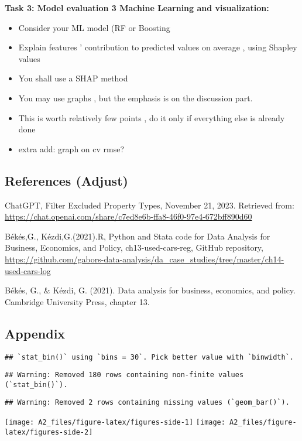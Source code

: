 \documentclass[
]{article}
\providecommand{\tightlist}{%
  \setlength{\itemsep}{0pt}\setlength{\parskip}{0pt}}
\begin{document}
\textbf{Task 3: Model evaluation 3 Machine Learning and visualization:}

\begin{itemize}
\tightlist
\item
  Consider your ML model (RF or Boosting
\item
  Explain features ' contribution to predicted values on average , using
  Shapley values
\item
  You shall use a SHAP method
\item
  You may use graphs , but the emphasis is on the discussion part.
\item
  This is worth relatively few points , do it only if everything else is
  already done
\item
  extra add: graph on cv rmse?
\end{itemize}

\hypertarget{references-adjust}{%
\subsection{References (Adjust)}\label{references-adjust}}

ChatGPT, Filter Excluded Property Types, November 21, 2023. Retrieved
from:
\url{https://chat.openai.com/share/c7ed8e6b-ffa8-46f0-97e4-672bff890d60}

Békés,G., Kézdi,G.(2021).R, Python and Stata code for Data Analysis for
Business, Economics, and Policy, ch13-used-cars-reg, GitHub repository,
\url{https://github.com/gabors-data-analysis/da_case_studies/tree/master/ch14-used-cars-log}

Békés, G., \& Kézdi, G. (2021). Data analysis for business, economics,
and policy. Cambridge University Press, chapter 13.

\hypertarget{appendix}{%
\subsection{Appendix}\label{appendix}}

\begin{verbatim}
## `stat_bin()` using `bins = 30`. Pick better value with `binwidth`.
\end{verbatim}

\begin{verbatim}
## Warning: Removed 180 rows containing non-finite values (`stat_bin()`).
\end{verbatim}

\begin{verbatim}
## Warning: Removed 2 rows containing missing values (`geom_bar()`).
\end{verbatim}

\texttt{[image: A2\_files/figure-latex/figures-side-1]}
\texttt{[image: A2\_files/figure-latex/figures-side-2]}
\end{document}
